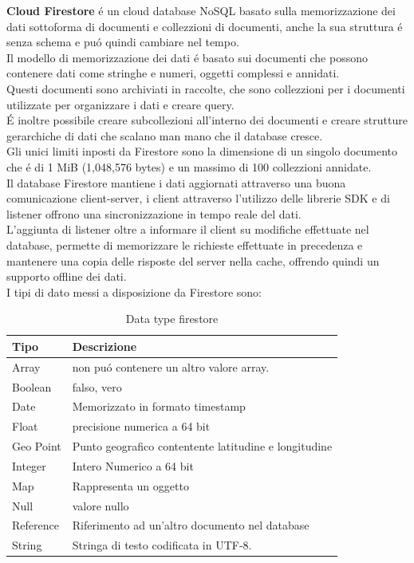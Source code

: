 \textbf{Cloud Firestore} \'e un cloud database NoSQL basato sulla memorizzazione dei dati sottoforma di documenti e collezzioni di documenti, anche la sua struttura \'e senza schema e pu\'o quindi cambiare nel tempo.\\
Il modello di memorizzazione dei dati \'e basato sui documenti che possono contenere dati come stringhe e numeri, oggetti complessi e annidati.\\
Questi documenti sono archiviati in raccolte, che sono collezzioni per i documenti utilizzate per organizzare i dati e creare query.\\
\'E inoltre possibile creare subcollezioni all'interno dei documenti e creare strutture gerarchiche di dati che scalano man mano che il database cresce.\\
Gli unici limiti inposti da Firestore sono la dimensione di un singolo documento che \'e di 1 MiB (1,048,576 bytes) e un massimo di 100 collezzioni annidate.\\
Il database Firestore mantiene i dati aggiornati attraverso una buona comunicazione client-server, i client attraverso l'utilizzo delle librerie SDK  e di listener offrono una sincronizzazione in tempo reale del dati.\\
L'aggiunta di listener oltre a informare il client su modifiche effettuate nel database, permette di memorizzare le richieste effettuate in precedenza e mantenere una copia delle risposte del server nella cache, offrendo quindi un supporto offline dei dati.\\

I tipi di dato messi a disposizione da Firestore sono:

\begin{table}[h]
\begin{center}
\begin{tabular}{|p{3cm}|p{10cm}|}
    \hline
\textbf{Tipo} & \textbf{Descrizione} \\ \hline
Array & non pu\'o contenere un altro valore array. \\ \hline
Boolean & falso, vero  \\ \hline
Date & Memorizzato in formato timestamp \\ \hline
Float & precisione numerica a 64 bit \\ \hline
Geo Point & Punto geografico contentente latitudine e longitudine \\ \hline
Integer & Intero Numerico a 64 bit \\ \hline
Map & Rappresenta un oggetto  \\ \hline
Null & valore nullo \\ \hline
Reference & Riferimento ad un'altro documento nel database  \\ \hline
String & Stringa di testo codificata in UTF-8.\\
\hline
\end{tabular}
\caption[Dati Firestore ]{Data type firestore}\label{tab:Firestore Dati}
\end{center}
\end{table}


